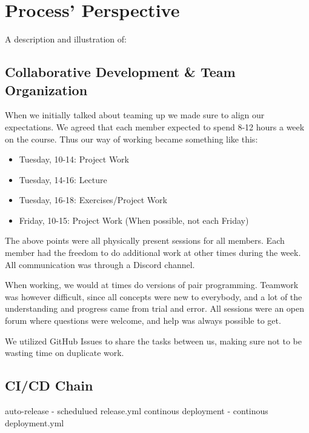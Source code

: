 \section{Process' Perspective}

A description and illustration of:

\subsection{Collaborative Development \& Team Organization}

When we initially talked about teaming up we made sure to align our expectations. We agreed that each member expected to spend 8-12 hours a week on the course. Thus our way of working became something like this:
\begin{itemize}
    \item Tuesday, 10-14: Project Work
    \item Tuesday, 14-16: Lecture
    \item Tuesday, 16-18: Exercises/Project Work
    \item Friday, 10-15: Project Work (When possible, not each Friday)
\end{itemize}

\noindent The above points were all physically present sessions for all members. Each member had the freedom to do additional work at other times during the week. All communication was through a Discord channel.

\noindent When working, we would at times do versions of pair programming. Teamwork was however difficult, since all concepts were new to everybody, and a lot of the understanding and progress came from trial and error. All sessions were an open forum where questions were welcome, and help was always possible to get.

\noindent We utilized GitHub Issues to share the tasks between us, making sure not to be wasting time on duplicate work.


\subsection{CI/CD Chain}


auto-release
-   schedulued release.yml
continous deployment
-  continous deployment.yml



